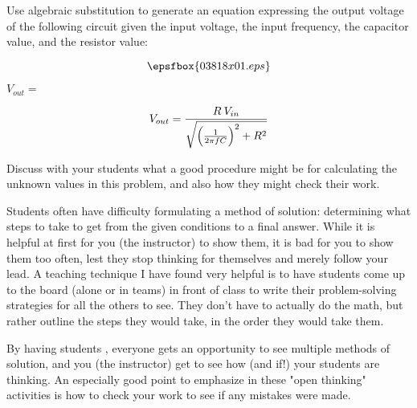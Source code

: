 

Use algebraic substitution to generate an equation expressing the output voltage of the following circuit given the input voltage, the input frequency, the capacitor value, and the resistor value:

$$\epsfbox{03818x01.eps}$$

\vskip 10pt

$V_{out} = $







$$V_{out} = {{R \> V_{in}} \over \sqrt{\left({1 \over 2 \pi f C}\right)^2 + R^2}}$$







Discuss with your students what a good procedure might be for calculating the unknown values in this problem, and also how they might check their work.

\vskip 10pt

Students often have difficulty formulating a method of solution: determining what steps to take to get from the given conditions to a final answer.  While it is helpful at first for you (the instructor) to show them, it is bad for you to show them too often, lest they stop thinking for themselves and merely follow your lead.  A teaching technique I have found very helpful is to have students come up to the board (alone or in teams) in front of class to write their problem-solving strategies for all the others to see.  They don't have to actually do the math, but rather outline the steps they would take, in the order they would take them.

By having students , everyone gets an opportunity to see multiple methods of solution, and you (the instructor) get to see how (and if!) your students are thinking.  An especially good point to emphasize in these "open thinking" activities is how to check your work to see if any mistakes were made.




